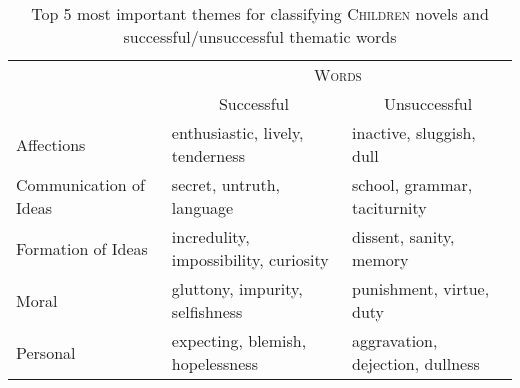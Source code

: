 \begin{table*}[!t]
    \caption{Top 5 most important themes for classifying \textsc{Children} novels and successful/unsuccessful thematic words}
    \label{tab:child themes}
    \begin{tabular}{l|ll}
        \hline
        \centering
        \multirow{2}{*}{\textsc{Theme}} & \multicolumn{2}{c}{\textsc{Words}} \\
        \cline{2-3}
        & \multicolumn{1}{c|}{Successful} & \multicolumn{1}{c}{Unsuccessful} \\
        \hline
        Affections & enthusiastic, lively, tenderness & inactive, sluggish, dull \\
        Communication of Ideas & secret, untruth, language & school, grammar, taciturnity \\
        Formation of Ideas & incredulity, impossibility, curiosity & dissent, sanity, memory \\
        Moral & gluttony, impurity, selfishness & punishment, virtue, duty \\
        Personal & expecting, blemish, hopelessness & aggravation, dejection, dullness \\
        \hline
    \end{tabular}
\end{table*}